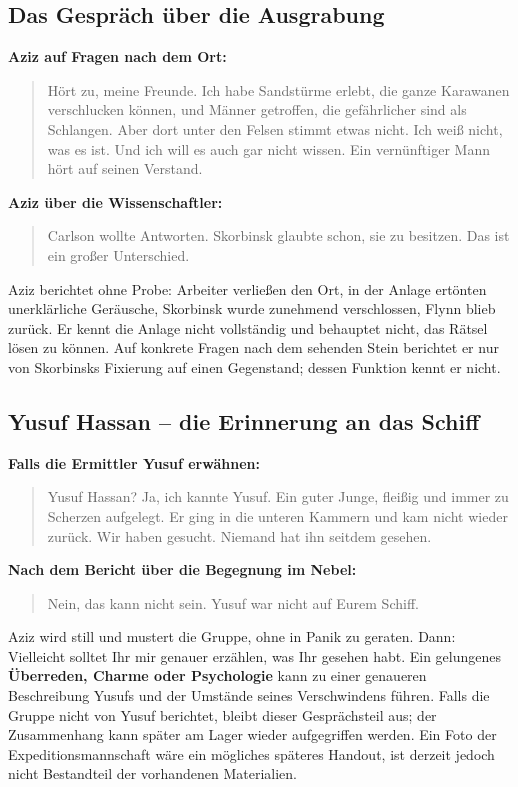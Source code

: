 \subsection{Das Gespräch über die Ausgrabung}
\noindent\textbf{Aziz auf Fragen nach dem Ort:}
\begin{quote}\glqq{}Hört zu, meine Freunde. Ich habe Sandstürme erlebt, die ganze Karawanen verschlucken können, und Männer getroffen, die gefährlicher sind als Schlangen. Aber dort unter den Felsen stimmt etwas nicht. Ich wei\ss{} nicht, was es ist. Und ich will es auch gar nicht wissen. Ein vernünftiger Mann hört auf seinen Verstand.\grqq{}\end{quote}
\noindent\textbf{Aziz über die Wissenschaftler:}
\begin{quote}\glqq{}Carlson wollte Antworten. Skorbinsk glaubte schon, sie zu besitzen. Das ist ein gro\ss{}er Unterschied.\grqq{}\end{quote}
\begin{meisterinfo}
Aziz berichtet ohne Probe: Arbeiter verlie\ss{}en den Ort, in der Anlage ertönten unerklärliche Geräusche, Skorbinsk wurde zunehmend verschlossen, Flynn blieb zurück. Er kennt die Anlage nicht vollständig und behauptet nicht, das Rätsel lösen zu können. Auf konkrete Fragen nach dem sehenden Stein berichtet er nur von Skorbinsks Fixierung auf einen Gegenstand; dessen Funktion kennt er nicht.
\end{meisterinfo}

\subsection{Yusuf Hassan -- die Erinnerung an das Schiff}
\noindent\textbf{Falls die Ermittler Yusuf erwähnen:}
\begin{quote}\glqq{}Yusuf Hassan? Ja, ich kannte Yusuf. Ein guter Junge, flei\ss{}ig und immer zu Scherzen aufgelegt. Er ging in die unteren Kammern und kam nicht wieder zurück. Wir haben gesucht. Niemand hat ihn seitdem gesehen.\grqq{}\end{quote}
\noindent\textbf{Nach dem Bericht über die Begegnung im Nebel:}
\begin{quote}\glqq{}Nein, das kann nicht sein. Yusuf war nicht auf Eurem Schiff.\grqq{}\end{quote}
\begin{meisterinfo}
Aziz wird still und mustert die Gruppe, ohne in Panik zu geraten. Dann: \glqq{}Vielleicht solltet Ihr mir genauer erzählen, was Ihr gesehen habt.\grqq{} Ein gelungenes \textbf{Überreden, Charme oder Psychologie} kann zu einer genaueren Beschreibung Yusufs und der Umstände seines Verschwindens führen. Falls die Gruppe nicht von Yusuf berichtet, bleibt dieser Gesprächsteil aus; der Zusammenhang kann später am Lager wieder aufgegriffen werden. Ein Foto der Expeditionsmannschaft wäre ein mögliches späteres Handout, ist derzeit jedoch nicht Bestandteil der vorhandenen Materialien.
\end{meisterinfo}

